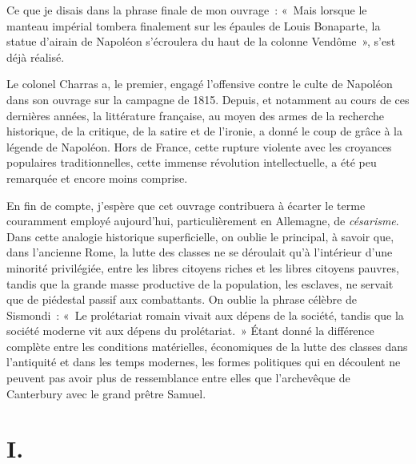 \documentclass[french,twoside]{book} %
\newcommand{\dateline}[1]{\medskip{\RaggedLeft{#1}\par}\bigskip}
\newcommand\chapteropen{} %
\begin{document}
Ce que je disais dans la phrase finale de mon ouvrage : « Mais lorsque le manteau impérial tombera finalement sur les épaules de Louis Bonaparte, la statue d’airain de Napoléon s’écroulera du haut de la colonne Vendôme », s’est déjà réalisé.\par
Le colonel Charras a, le premier, engagé l’offensive contre le culte de Napoléon dans son ouvrage sur la campagne de 1815. Depuis, et notamment au cours de ces dernières années, la littérature française, au moyen des armes de la recherche historique, de la critique, de la satire et de l’ironie, a donné le coup de grâce à la légende de Napoléon. Hors de France, cette rupture violente avec les croyances populaires traditionnelles, cette immense révolution intellectuelle, a été peu remarquée et encore moins comprise.\par
En fin de compte, j’espère que cet ouvrage contribuera à écarter le terme couramment employé aujourd’hui, particulièrement en Allemagne, de \emph{césarisme}. Dans cette analogie historique superficielle, on oublie le principal, à savoir que, dans l’ancienne Rome, la lutte des classes ne se déroulait qu’à l’intérieur d’une minorité privilégiée, entre les libres citoyens riches et les libres citoyens pauvres, tandis que la grande masse productive de la population, les esclaves, ne servait que de piédestal passif aux combattants. On oublie la phrase célèbre de Sismondi : « Le prolétariat romain vivait aux dépens de la société, tandis que la société moderne vit aux dépens du prolétariat. » Étant donné la différence complète entre les conditions matérielles, économiques de la lutte des classes dans l’antiquité et dans les temps modernes, les formes politiques qui en découlent ne peuvent pas avoir plus de ressemblance entre elles que l’archevêque de Canterbury avec le grand prêtre Samuel.\par

\dateline{Londres, 23 juin 1869. \\
Karl Marx}

\chapteropen
\chapter[{I.}]{I.}\renewcommand{\leftmark}{I.}
\end{document}
